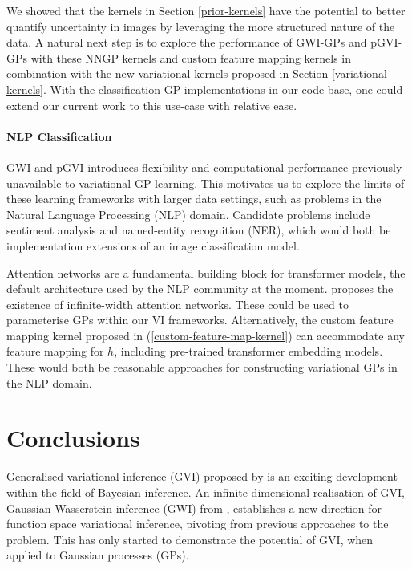 \documentclass{article}
\numberwithin{equation}{section}
\begin{document}
We showed that the kernels in Section \ref{prior-kernels} have the potential to better quantify uncertainty in images by leveraging the more structured nature of the data.
A natural next step is to explore the performance of GWI-GPs and pGVI-GPs with these NNGP kernels and custom feature mapping kernels in combination with the new variational kernels proposed in Section \ref{variational-kernels}.
With the classification GP implementations in our code base, one could extend our current work to this use-case with relative ease.

\paragraph{NLP Classification} GWI and pGVI introduces flexibility and computational performance previously unavailable to variational GP learning. 
This motivates us to explore the limits of these learning frameworks with larger data settings, such as problems in the Natural Language Processing (NLP) domain.
Candidate problems include sentiment analysis and named-entity recognition (NER), which would both be implementation extensions of an image classification model.

Attention networks are a fundamental building block for transformer models, the default architecture used by the NLP community at the moment. \cite{pmlr-v119-hron20a} proposes the existence of infinite-width attention networks.
These could be used to parameterise GPs within our VI frameworks.
Alternatively, the custom feature mapping kernel proposed in (\ref{custom-feature-map-kernel}) can accommodate any feature mapping for $h$, including pre-trained transformer embedding models. 
These would both be reasonable approaches for constructing variational GPs in the NLP domain.

\newpage
\section{Conclusions}\label{section:conclusions}
Generalised variational inference (GVI) proposed by \cite{knoblauch2022optimization} is an exciting development within the field of Bayesian inference.
An infinite dimensional realisation of GVI, Gaussian Wasserstein inference (GWI) from \cite{wild2022generalized}, establishes a new direction for function space variational inference, pivoting from previous approaches to the problem.
This has only started to demonstrate the potential of GVI, when applied to Gaussian processes (GPs). 
\end{document}
